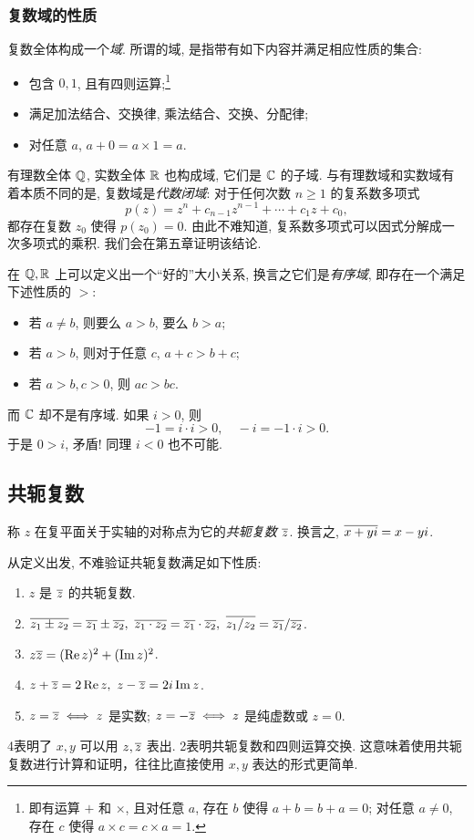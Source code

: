 \subsubsection*{复数域的性质}

复数全体构成一个\emph{域}.
所谓的域, 是指带有如下内容并满足相应性质的集合:
\begin{itemize}
  \item 包含 $0,1$, 且有四则运算;\footnote{即有运算 $+$ 和 $\times$, 且对任意 $a$, 存在 $b$ 使得 $a+b=b+a=0$; 对任意 $a\neq 0$, 存在 $c$ 使得 $a\times c=c\times a=1$.}
  \item 满足加法结合、交换律, 乘法结合、交换、分配律;
  \item 对任意 $a$, $a+0=a\times 1=a$.
\end{itemize}
有理数全体 ${\mathbb{Q}}$, 实数全体 ${\mathbb{R}}$ 也构成域, 它们是 ${\mathbb{C}}$ 的子域.
与有理数域和实数域有着本质不同的是, 复数域是\emph{代数闭域}:
对于任何次数 $n\ge 1$ 的复系数多项式
  \[p(z)=z^n+c_{n-1}z^{n-1}+\cdots+c_1z+c_0,\]
都存在复数 $z_0$ 使得 $p(z_0)=0$.
由此不难知道, 复系数多项式可以因式分解成一次多项式的乘积.
我们会在第五章证明该结论.

在 ${\mathbb{Q}},{\mathbb{R}}$ 上可以定义出一个``好的''大小关系, 换言之它们是\emph{有序域}, 即存在一个满足下述性质的 $>$:
\begin{itemize}
  \item 若 $a\neq b$, 则要么 $a>b$, 要么 $b>a$;
  \item 若 $a>b$, 则对于任意 $c$, $a+c>b+c$;
  \item 若 $a>b,c>0$, 则 $ac>bc$.
\end{itemize}
而 \alert{${\mathbb{C}}$ 却不是有序域}.
如果 $i>0$, 则
  \[-1=i\cdot i>0,\quad -i=-1\cdot i>0.\]
于是 $0>i$, 矛盾! 同理 $i<0$ 也不可能.


\subsection{共轭复数}

\begin{definition}
  称 $z$ 在复平面关于实轴的对称点为它的\emph{共轭复数 $\overline z$}.
换言之, $\overline{x+yi}=x-yi$.
\end{definition}
从定义出发, 不难验证共轭复数满足如下性质:
\begin{enumerate}
  \item $z$ 是 $\overline z$ 的共轭复数.
  \item $\ov{z_1\pm z_2}=\ov{z_1}\pm\ov{z_2},\ 
  \ov{z_1\cdot z_2}=\ov{z_1}\cdot\ov{z_2},\ 
  \ov{z_1/z_2}=\ov{z_1}/\ov{z_2}$.
  \item $z\overline{z}=(\operatorname{Re} z)^2+(\operatorname{Im} z)^2$.
  \item $z+\overline z=2\operatorname{Re} z,\ z-\overline z=2i\operatorname{Im} z$.
  \item $z=\overline z\iff z$ 是实数; $z=-\overline z\iff z$ 是纯虚数或 $z=0$.
\end{enumerate}
\enumnum4表明了 $x,y$ 可以用 $z,\overline z$ 表出.
\enumnum2表明共轭复数和四则运算交换.
这意味着使用共轭复数进行计算和证明，往往比直接使用 $x,y$ 表达的形式更简单.

